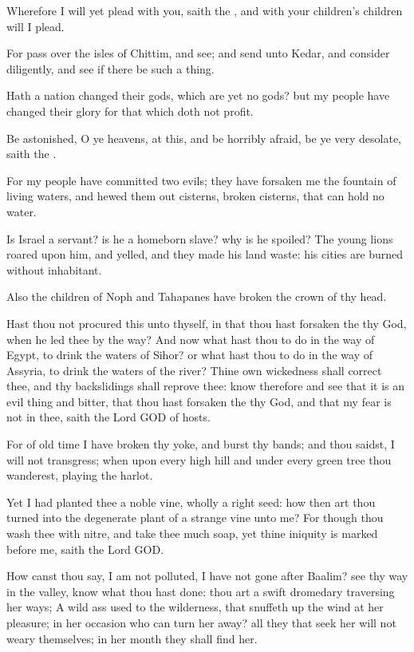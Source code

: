 \verse Wherefore I will yet plead with you, saith the \LORD, and with your children's children will I plead.

\verse For pass over the isles of Chittim, and see; and send unto Kedar, and consider diligently, and see if there be such a thing.

\verse Hath a nation changed their gods, which are yet no gods? but my people have changed their glory for that which doth not profit.

\verse Be astonished, O ye heavens, at this, and be horribly afraid, be ye very desolate, saith the \LORD.

\verse For my people have committed two evils; they have forsaken me the fountain of living waters, and hewed them out cisterns, broken cisterns, that can hold no water.

\verse Is Israel a servant? is he a homeborn slave? why is he spoiled?  \verse The young lions roared upon him, and yelled, and they made his land waste: his cities are burned without inhabitant.

\verse Also the children of Noph and Tahapanes have broken the crown of thy head.

\verse Hast thou not procured this unto thyself, in that thou hast forsaken the \LORD thy God, when he led thee by the way?  \verse And now what hast thou to do in the way of Egypt, to drink the waters of Sihor? or what hast thou to do in the way of Assyria, to drink the waters of the river?  \verse Thine own wickedness shall correct thee, and thy backslidings shall reprove thee: know therefore and see that it is an evil thing and bitter, that thou hast forsaken the \LORD thy God, and that my fear is not in thee, saith the Lord GOD of hosts.

\verse For of old time I have broken thy yoke, and burst thy bands; and thou saidst, I will not transgress; when upon every high hill and under every green tree thou wanderest, playing the harlot.

\verse Yet I had planted thee a noble vine, wholly a right seed: how then art thou turned into the degenerate plant of a strange vine unto me?  \verse For though thou wash thee with nitre, and take thee much soap, yet thine iniquity is marked before me, saith the Lord GOD.

\verse How canst thou say, I am not polluted, I have not gone after Baalim?  see thy way in the valley, know what thou hast done: thou art a swift dromedary traversing her ways; \verse A wild ass used to the wilderness, that snuffeth up the wind at her pleasure; in her occasion who can turn her away? all they that seek her will not weary themselves; in her month they shall find her.

